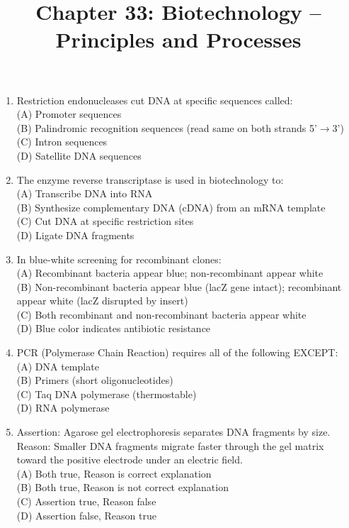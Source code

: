 \documentclass{article}
\begin{document}
\title{Chapter 33: Biotechnology -- Principles and Processes}
\date{}
\maketitle

\begin{enumerate}[label=Q\arabic*.]

\item Restriction endonucleases cut DNA at specific sequences called:
\\(A) Promoter sequences
\\(B) Palindromic recognition sequences (read same on both strands 5'$\rightarrow$3')
\\(C) Intron sequences
\\(D) Satellite DNA sequences

\item The enzyme reverse transcriptase is used in biotechnology to:
\\(A) Transcribe DNA into RNA
\\(B) Synthesize complementary DNA (cDNA) from an mRNA template
\\(C) Cut DNA at specific restriction sites
\\(D) Ligate DNA fragments

\item In blue-white screening for recombinant clones:
\\(A) Recombinant bacteria appear blue; non-recombinant appear white
\\(B) Non-recombinant bacteria appear blue (lacZ gene intact); recombinant appear white (lacZ disrupted by insert)
\\(C) Both recombinant and non-recombinant bacteria appear white
\\(D) Blue color indicates antibiotic resistance

\item PCR (Polymerase Chain Reaction) requires all of the following EXCEPT:
\\(A) DNA template
\\(B) Primers (short oligonucleotides)
\\(C) Taq DNA polymerase (thermostable)
\\(D) RNA polymerase

\item Assertion: Agarose gel electrophoresis separates DNA fragments by size.\\
Reason: Smaller DNA fragments migrate faster through the gel matrix toward the positive electrode under an electric field.
\\(A) Both true, Reason is correct explanation
\\(B) Both true, Reason is not correct explanation
\\(C) Assertion true, Reason false
\\(D) Assertion false, Reason true


\end{enumerate}
\end{document}
